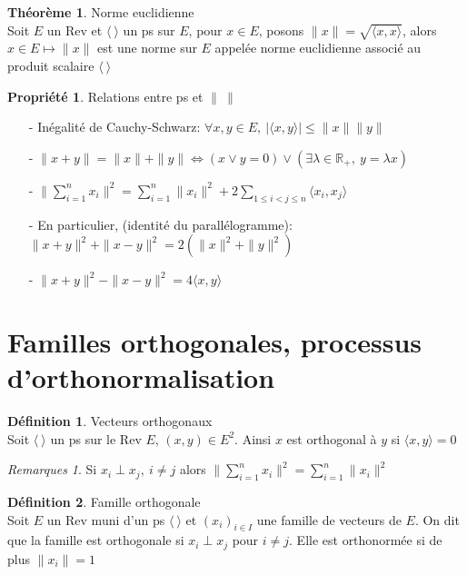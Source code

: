 \documentclass[fleqn]{article}
\theoremstyle{definition} \newtheorem*{defi}{D\'efinition}
\theoremstyle{definition} \newtheorem*{theo}{Th\'eor\`eme}
\theoremstyle{definition} \newtheorem*{coro}{Corollaire}
\theoremstyle{remark} \newtheorem*{rqs}{Remarques}
\theoremstyle{definition} \newtheorem*{prop}{Propri\'et\'e}
\begin{document}
\begin{theo}  Norme euclidienne \\
	Soit $E$ un Rev et $\langle\ \rangle$ un ps sur $E$, pour $x \in E$, posons \mbox{$\|x\| = \sqrt{\langle x,x \rangle}$}, alors $x \in E
	\mapsto \|x\|$ est une norme sur $E$ appel\'ee norme euclidienne associ\'e au produit scalaire $\langle\ \rangle$
\end{theo}

\begin{prop} Relations entre ps et $\| \ \|$
	\begin{enumerate}
		\item [-] In\'egalit\'e de Cauchy-Schwarz: $\forall x,y \in E,\ |\langle x,y \rangle| \leq \|x\| \|y\|$
		\item [-] $\|x+y\| = \|x\| + \|y\| \Leftrightarrow (x \lor y = 0) \lor (\exists \lambda \in \mathbb{R}_+,\ y = \lambda x)$
		\item [-] $\|\sum_{i=1}^n x_i \| ^2 = \sum_{i=1}^n \|x_i\|^2 + 2\sum_{1 \leq i < j \leq n} \langle x_i,x_j \rangle$
		\item [-] En particulier, (identit\'e du parall\'elogramme):\\
			$\|x+y\|^2 + \|x-y\|^2 = 2(\|x\|^2 + \|y\|^2)$
		\item [-] $\|x+y\|^2 - \|x-y\|^2= 4\langle x,y \rangle$
	\end{enumerate}
\end{prop}

\section{Familles orthogonales, processus d'orthonormalisation}

\begin{defi} Vecteurs orthogonaux \\
	Soit $\langle\ \rangle$ un ps sur le Rev $E$, $(x,y) \in E^2$. Ainsi $x$ est orthogonal \`a $y$ si $\langle x,y \rangle = 0$
	\begin{rqs} Si $x_i \perp x_j,\ i \neq j$ alors $\|\sum_{i=1}^n x_i \|^2 = \sum_{i=1}^n \|x_i\|^2$ \end{rqs}
\end{defi}

\begin{defi} Famille orthogonale \\
	Soit $E$ un Rev muni d'un ps $\langle\ \rangle$ et $(x_i)_{i\in I}$ une famille de vecteurs de $E$. On dit que la famille est orthogonale si
	$x_i \perp x_j$ pour $i\neq j$. Elle est orthonorm\'ee si de plus $\|x_i\| = 1$
\end{defi}
\end{document}
